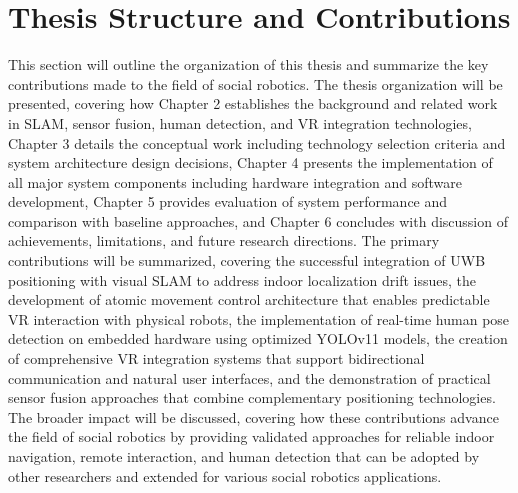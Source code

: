 \section{Thesis Structure and Contributions}
This section will outline the organization of this thesis and summarize the key contributions made to the field of social robotics. The thesis organization will be presented, covering how Chapter 2 establishes the background and related work in SLAM, sensor fusion, human detection, and VR integration technologies, Chapter 3 details the conceptual work including technology selection criteria and system architecture design decisions, Chapter 4 presents the implementation of all major system components including hardware integration and software development, Chapter 5 provides evaluation of system performance and comparison with baseline approaches, and Chapter 6 concludes with discussion of achievements, limitations, and future research directions. The primary contributions will be summarized, covering the successful integration of UWB positioning with visual SLAM to address indoor localization drift issues, the development of atomic movement control architecture that enables predictable VR interaction with physical robots, the implementation of real-time human pose detection on embedded hardware using optimized YOLOv11 models, the creation of comprehensive VR integration systems that support bidirectional communication and natural user interfaces, and the demonstration of practical sensor fusion approaches that combine complementary positioning technologies. The broader impact will be discussed, covering how these contributions advance the field of social robotics by providing validated approaches for reliable indoor navigation, remote interaction, and human detection that can be adopted by other researchers and extended for various social robotics applications.
